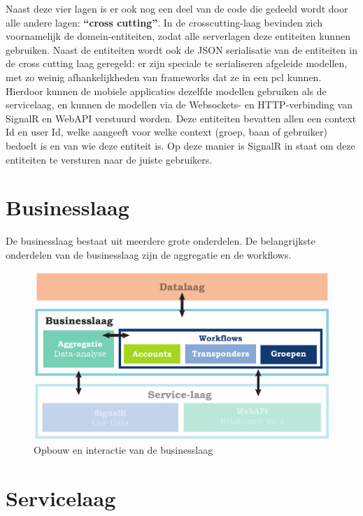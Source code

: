 Naast deze vier lagen is er ook nog een deel van de code die gedeeld wordt door alle andere lagen: \textbf{``cross cutting''}. In de crosscutting-laag bevinden zich voornamelijk de domein-entiteiten, zodat alle serverlagen deze entiteiten kunnen gebruiken. Naast de entiteiten wordt ook de JSON serialisatie van de entiteiten in de cross cutting laag geregeld: er zijn  speciale te serialiseren afgeleide modellen, met zo weinig afhankelijkheden van frameworks dat ze in een \ac{pcl} kunnen. Hierdoor kunnen de mobiele applicaties dezelfde modellen gebruiken als de servicelaag, en kunnen de modellen via de Websockets- en HTTP-verbinding van SignalR en WebAPI verstuurd worden. Deze entiteiten bevatten allen een context Id en user Id, welke aangeeft voor welke context (groep, baan of gebruiker) bedoelt is en van wie deze entiteit is. Op deze manier is SignalR in staat om deze entiteiten te versturen naar de juiste gebruikers.

  

\section{Businesslaag}
  De businesslaag bestaat uit meerdere grote onderdelen. De belangrijkste onderdelen van de businesslaag zijn de aggregatie en de workflows.
 
\begin{figure}[ht]
  \begin{center}
  \includegraphics[width=.6\textwidth]{style/images/Businesslaag}    
  \end{center}
  \caption{Opbouw en interactie van de businesslaag}  
  \label{fig:lagen-businesslaag}
\end{figure}
  
  
  
  
  
\section{Servicelaag}
  
  

